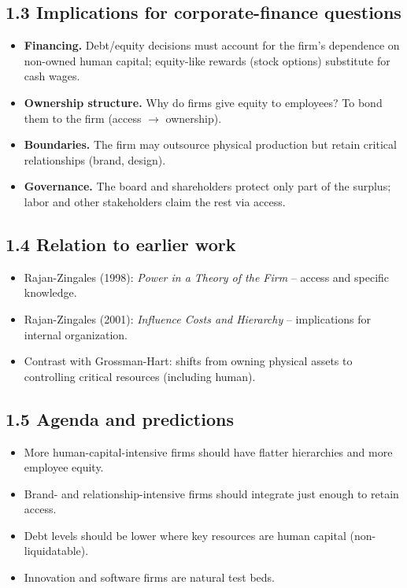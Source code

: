 \documentclass[11pt]{article}
\begin{document}
\subsection*{1.3 Implications for corporate-finance questions}
\begin{itemize}
\item \textbf{Financing.} Debt/equity decisions must account for the firm's dependence on non-owned human capital; equity-like rewards (stock options) substitute for cash wages.
\item \textbf{Ownership structure.} Why do firms give equity to employees? To bond them to the firm (access $\to$ ownership).
\item \textbf{Boundaries.} The firm may outsource physical production but retain critical relationships (brand, design).
\item \textbf{Governance.} The board and shareholders protect only part of the surplus; labor and other stakeholders claim the rest via access.
\end{itemize}

\subsection*{1.4 Relation to earlier work}
\begin{itemize}
\item Rajan-Zingales (1998): \emph{Power in a Theory of the Firm} -- access and specific knowledge.
\item Rajan-Zingales (2001): \emph{Influence Costs and Hierarchy} -- implications for internal organization.
\item Contrast with Grossman-Hart: shifts from owning physical assets to controlling critical resources (including human).
\end{itemize}

\subsection*{1.5 Agenda and predictions}
\begin{itemize}
\item More human-capital-intensive firms should have flatter hierarchies and more employee equity.
\item Brand- and relationship-intensive firms should integrate just enough to retain access.
\item Debt levels should be lower where key resources are human capital (non-liquidatable).
\item Innovation and software firms are natural test beds.
\end{itemize}
\end{document}
